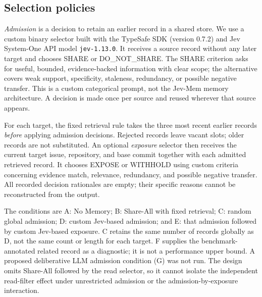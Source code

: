 \documentclass[sigconf,anonymous]{aamas}
\begin{document}
\subsection{Selection policies}
\emph{Admission} is a decision to retain an earlier record in a shared store. We use a custom binary selector built with the TypeSafe SDK (version 0.7.2) and Jev System-One API model \texttt{jev-1.13.0}. It receives a source record without any later target and chooses SHARE or DO\_NOT\_SHARE. The SHARE criterion asks for useful, bounded, evidence-backed information with clear scope; the alternative covers weak support, specificity, staleness, redundancy, or possible negative transfer. This is a custom categorical prompt, not the Jev-Mem memory architecture. A decision is made once per source and reused wherever that source appears.

For each target, the fixed retrieval rule takes the three most recent earlier records \emph{before} applying admission decisions. Rejected records leave vacant slots; older records are not substituted. An optional \emph{exposure} selector then receives the current target issue, repository, and base commit together with each admitted retrieved record. It chooses EXPOSE or WITHHOLD using custom criteria concerning evidence match, relevance, redundancy, and possible negative transfer. All recorded decision rationales are empty; their specific reasons cannot be reconstructed from the output.

The conditions are A: No Memory; B: Share-All with fixed retrieval; C: random global admission; D: custom Jev-based admission; and E: that admission followed by custom Jev-based exposure. C retains the same number of records globally as D, not the same count or length for each target. F supplies the benchmark-annotated related record as a diagnostic; it is not a performance upper bound. A proposed deliberative LLM admission condition (G) was not run. The design omits Share-All followed by the read selector, so it cannot isolate the independent read-filter effect under unrestricted admission or the admission-by-exposure interaction.
\end{document}
